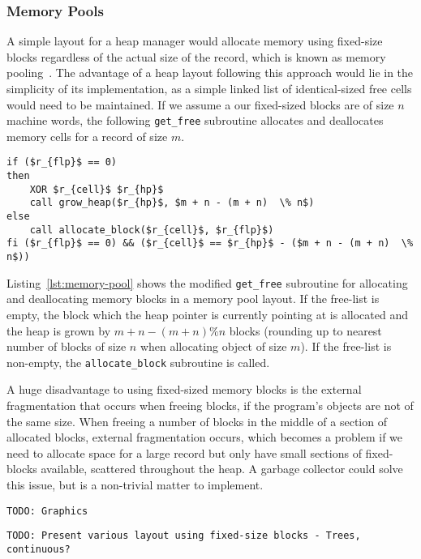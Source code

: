 \subsubsection{Memory Pools}
A simple layout for a heap manager would allocate memory using fixed-size blocks regardless of the actual size of the record, which is known as memory pooling~\cite{bk:memorypool}. The advantage of a heap layout following this approach would lie in the simplicity of its implementation, as a simple linked list of identical-sized free cells would need to be maintained. If we assume a our fixed-sized blocks are of size $n$ machine words, the following \texttt{get\_free} subroutine allocates and deallocates memory cells for a record of size $m$.

\begin{lstlisting}[mathescape=true, caption={Allocating and deallocating records of size $m$ using block of a fixed size $n$. Code modified from~\cite{ha:heap}}, language=janus, style=basic,label={lst:memory-pool}]
if ($r_{flp}$ == 0) 
then
	XOR $r_{cell}$ $r_{hp}$
	call grow_heap($r_{hp}$, $m + n - (m + n)  \% n$)
else
	call allocate_block($r_{cell}$, $r_{flp}$)
fi ($r_{flp}$ == 0) && ($r_{cell}$ == $r_{hp}$ - ($m + n - (m + n)  \% n$))
\end{lstlisting}

Listing~\ref{lst:memory-pool} shows the modified \texttt{get\_free} subroutine for allocating and deallocating memory blocks in a memory pool layout. If the free-list is empty, the block which the heap pointer is currently pointing at is allocated and the heap is grown by $m + n - (m + n)  \% n$ blocks (rounding up to nearest number of blocks of size $n$ when allocating object of size $m$). If the free-list is non-empty, the \texttt{allocate\_block} subroutine is called.  

A huge disadvantage to using fixed-sized memory blocks is the external fragmentation that occurs when freeing blocks, if the program's objects are not of the same size. When freeing a number of blocks in the middle of a section of allocated blocks, external fragmentation occurs, which becomes a problem if we need to allocate space for a large record but only have small sections of fixed-blocks available, scattered throughout the heap. A garbage collector could solve this issue, but is a non-trivial matter to implement.

\texttt{TODO: Graphics}

\texttt{TODO: Present various layout using fixed-size blocks - Trees, continuous?}


